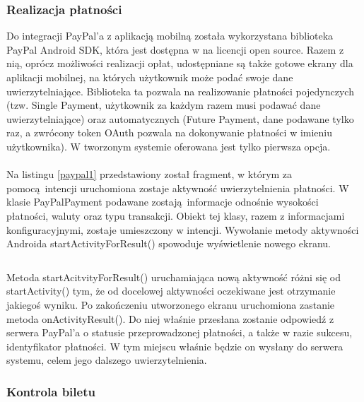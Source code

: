 \subsubsection*{Realizacja płatności}

Do integracji PayPal'a z aplikacją mobilną została wykorzystana biblioteka PayPal Android SDK, która jest dostępna w na licencji open source. Razem z nią, oprócz możliwości realizacji opłat, udostępniane są także gotowe ekrany dla aplikacji mobilnej, na których użytkownik może podać swoje dane uwierzytelniające. Biblioteka ta pozwala na realizowanie płatności pojedynczych (tzw. Single Payment, użytkownik za każdym razem musi podawać dane uwierzytelniające) oraz automatycznych (Future Payment, dane podawane tylko raz, a zwrócony token OAuth pozwala na dokonywanie płatności w imieniu użytkownika). W tworzonym systemie oferowana jest tylko pierwsza opcja.
\\
\\
Na listingu \ref{paypal1} przedstawiony został fragment, w którym za pomocą intencji uruchomiona zostaje aktywność uwierzytelnienia płatności. W klasie PayPalPayment podawane zostają informacje odnośnie wysokości płatności, waluty oraz typu transakcji. Obiekt tej klasy, razem z informacjami konfiguracyjnymi, zostaje umieszczony w intencji. Wywołanie metody aktywności Androida startActivityForResult() spowoduje wyświetlenie nowego ekranu.

\begin{singlespace}
	\label{paypal1}
	\vspace{0.3cm}
	\inputminted[fontsize=\footnotesize]{java}{src/imp/get-payment.java}
\end{singlespace}

\vspace{0.3cm}

Metoda startAcitvityForResult() uruchamiająca nową aktywność różni się od startActivity() tym, że od docelowej aktywności oczekiwane jest otrzymanie jakiegoś wyniku. Po zakończeniu utworzonego ekranu uruchomiona zastanie metoda onActivityResult(). Do niej właśnie przesłana zostanie odpowiedź z serwera PayPal'a o statusie przeprowadzonej płatności, a także w razie sukcesu, identyfikator płatności. W tym miejscu właśnie będzie on wysłany do serwera systemu, celem jego dalszego uwierzytelnienia.

\subsubsection*{Kontrola biletu}

